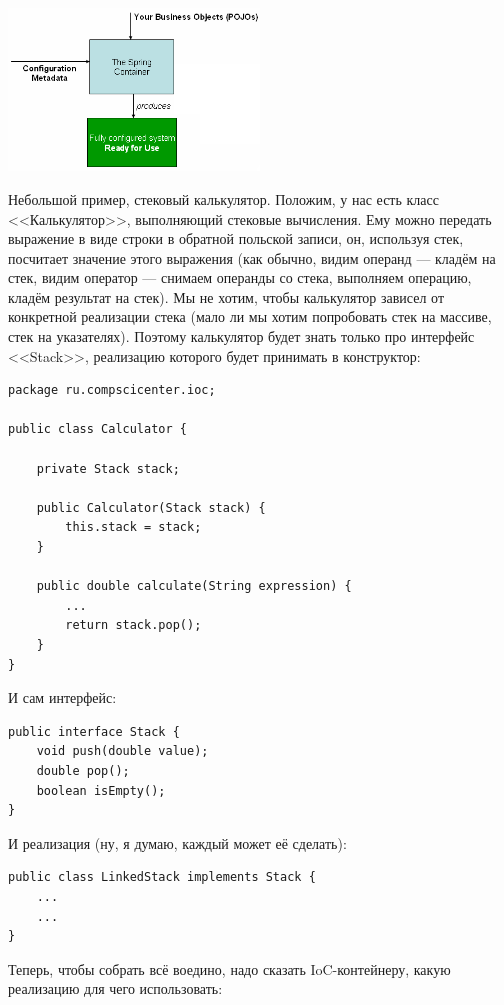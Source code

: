 \documentclass[a5paper]{article}
\begin{document}
\begin{center}
    \includegraphics[width=0.5\textwidth]{springIoC.png}
\end{center}

Небольшой пример, стековый калькулятор. Положим, у нас есть класс <<Калькулятор>>, выполняющий стековые вычисления. Ему можно передать выражение в виде строки в обратной польской записи, он, используя стек, посчитает значение этого выражения (как обычно, видим операнд --- кладём на стек, видим оператор --- снимаем операнды со стека, выполняем операцию, кладём результат на стек). Мы не хотим, чтобы калькулятор зависел от конкретной реализации стека (мало ли мы хотим попробовать стек на массиве, стек на указателях). Поэтому калькулятор будет знать только про интерфейс <<Stack>>, реализацию которого будет принимать в конструктор:

\begin{verbatim}
package ru.compscicenter.ioc;

public class Calculator {

    private Stack stack;

    public Calculator(Stack stack) {
        this.stack = stack;
    }

    public double calculate(String expression) {
        ...
        return stack.pop();
    }
}
\end{verbatim}

И сам интерфейс:

\begin{verbatim}
public interface Stack {
    void push(double value);
    double pop();
    boolean isEmpty();
}
\end{verbatim}

И реализация (ну, я думаю, каждый может её сделать):

\begin{verbatim}
public class LinkedStack implements Stack {
    ...
    ...
}
\end{verbatim}

Теперь, чтобы собрать всё воедино, надо сказать IoC-контейнеру, какую реализацию для чего использовать:
\end{document}
